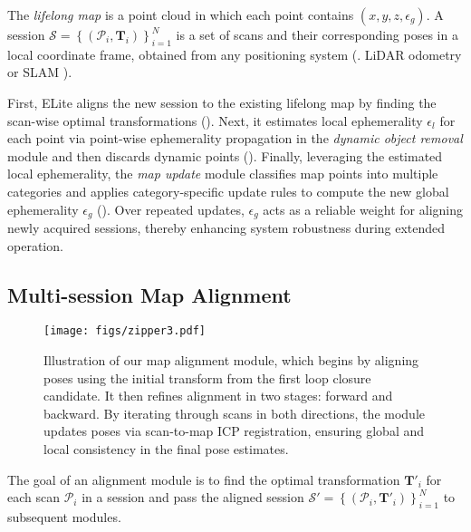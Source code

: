 The \emph{lifelong map} is a point cloud in which each point contains $(x,y,z, \epsilon_{g})$.  
A session $\mathcal{S} = \left\{ \left( \mathcal{P}_i, \mathbf{T}_i \right) \right\}_{i=1}^N$ is a set of scans and their corresponding poses in a local coordinate frame, obtained from any positioning system (\eg. LiDAR odometry \cite{xu2022fast} or SLAM \cite{shan2020lio}).

First, ELite aligns the new session to the existing lifelong map by finding the scan-wise optimal transformations ().  
Next, it estimates local ephemerality $\epsilon_{l}$ for each point via point-wise ephemerality propagation in the \emph{dynamic object removal} module and then discards dynamic points ().  
Finally, leveraging the estimated local ephemerality, the \emph{map update} module classifies map points into multiple categories and applies category-specific update rules to compute the new global ephemerality $\epsilon_{g}$ ().  
Over repeated updates, $\epsilon_{g}$ acts as a reliable weight for aligning newly acquired sessions, thereby enhancing system robustness during extended operation.

\subsection{Multi-session Map Alignment}
\label{subsec:map_alignment}

\begin{figure}[!t]
    \centering
    \texttt{[image: figs/zipper3.pdf]}
    \caption{
    Illustration of our map alignment module, which begins by aligning poses using the initial transform from the first loop closure candidate. It then refines alignment in two stages: forward and backward. By iterating through scans in both directions, the module updates poses via scan-to-map ICP registration, ensuring global and local consistency in the final pose estimates.
    }
    \label{fig:zipper}
    \vspace{-3mm}
\end{figure}

The goal of an alignment module is to find the optimal transformation \( \mathbf{T}'_i \) for each scan $\mathcal{P}_i$ in a session and pass the aligned session \(\mathcal{S'} = \left\{ \left( \mathcal{P}_i, \mathbf{T}'_i \right) \right\}_{i=1}^N\) to subsequent modules.


